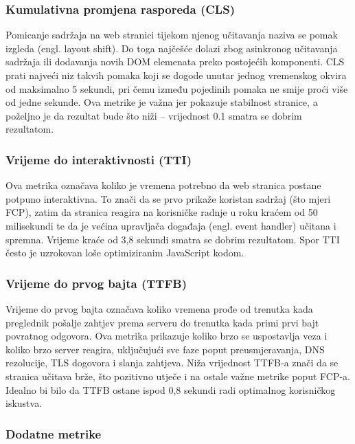 \subsubsection{Kumulativna promjena rasporeda (CLS)}

Pomicanje sadržaja na web stranici tijekom njenog učitavanja naziva se  pomak izgleda (engl. layout shift). Do toga najčešće dolazi zbog asinkronog učitavanja sadržaja ili dodavanja novih DOM elemenata preko postojećih komponenti. CLS prati najveći niz takvih pomaka koji se dogode unutar jednog vremenskog okvira od maksimalno 5 sekundi, pri čemu između pojedinih pomaka ne smije proći više od jedne sekunde. Ova metrike je važna jer pokazuje stabilnost stranice, a poželjno je da rezultat bude što niži – vrijednost 0.1 smatra se dobrim rezultatom. \cite{nordstrom2023comparison}

\subsubsection{Vrijeme do interaktivnosti (TTI)}

Ova metrika označava koliko je vremena potrebno da web stranica postane potpuno interaktivna. To znači da se prvo prikaže koristan sadržaj (što mjeri FCP), zatim da stranica reagira na korisničke radnje u roku kraćem od 50 milisekundi te da je većina upravljača događaja (engl. event handler) učitana i spremna. Vrijeme kraće od 3,8 sekundi smatra se dobrim rezultatom. Spor TTI često je uzrokovan loše optimiziranim JavaScript kodom. \cite{nordstrom2023comparison}

\subsubsection{Vrijeme do prvog bajta (TTFB)}

Vrijeme do prvog bajta označava koliko vremena prođe od trenutka kada preglednik pošalje zahtjev prema serveru do trenutka kada primi prvi bajt povratnog odgovora. Ova metrika prikazuje koliko brzo se uspostavlja veza i koliko brzo server reagira, uključujući sve faze poput preusmjeravanja, DNS rezolucije, TLS dogovora i slanja zahtjeva. Niža vrijednost TTFB-a znači da se stranica učitava brže, što pozitivno utječe i na ostale važne metrike poput FCP-a. Idealno bi bilo da TTFB ostane ispod 0,8 sekundi radi optimalnog korisničkog iskustva. \cite{pollardttfb}

\subsubsection{Dodatne metrike}

